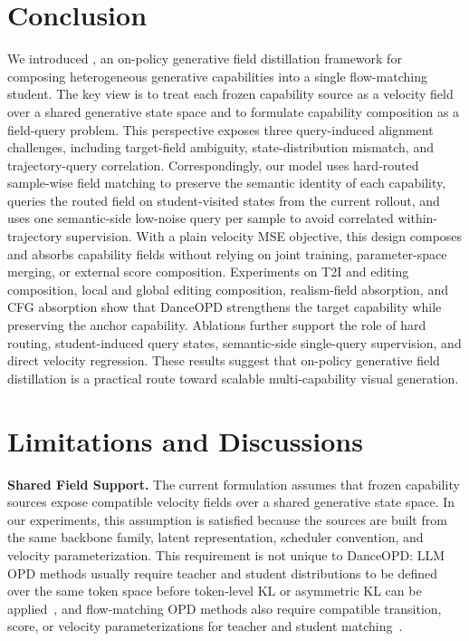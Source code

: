 \section{Conclusion}

We introduced \name{}, an on-policy generative field distillation framework for composing heterogeneous generative capabilities into a single flow-matching student. The key view is to treat each frozen capability source as a velocity field over a shared generative state space and to formulate capability composition as a field-query problem. This perspective exposes three query-induced alignment challenges, including target-field ambiguity, state-distribution mismatch, and trajectory-query correlation. Correspondingly, our model uses hard-routed sample-wise field matching to preserve the semantic identity of each capability, queries the routed field on student-visited states from the current rollout, and uses one semantic-side low-noise query per sample to avoid correlated within-trajectory supervision. With a plain velocity MSE objective, this design composes and absorbs capability fields without relying on joint training, parameter-space merging, or external score composition. Experiments on T2I and editing composition, local and global editing composition, realism-field absorption, and CFG absorption show that DanceOPD strengthens the target capability while preserving the anchor capability. Ablations further support the role of hard routing, student-induced query states, semantic-side single-query supervision, and direct velocity regression. These results suggest that on-policy generative field distillation is a practical route toward scalable multi-capability visual generation.


\vspace{0.2cm}


\section{Limitations and Discussions}
\label{sec:limitations}

\noindent\textbf{Shared Field Support.}
The current formulation assumes that frozen capability sources expose compatible velocity fields over a shared generative state space. In our experiments, this assumption is satisfied because the sources are built from the same backbone family, latent representation, scheduler convention, and velocity parameterization. This requirement is not unique to DanceOPD: LLM OPD methods usually require teacher and student distributions to be defined over the same token space before token-level KL or asymmetric KL can be applied~\cite{gu2024minillm,agarwal2024policy,jia2026asymmetric}, and flow-matching OPD methods also require compatible transition, score, or velocity parameterizations for teacher and student matching~\cite{li2026diffusionopd,jiang2026d,fang2026flow}.

